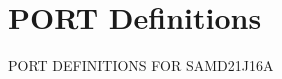 \hypertarget{group___s_a_m_d21_j16_a__port}{}\section{P\+O\+RT Definitions}
\label{group___s_a_m_d21_j16_a__port}
P\+O\+RT D\+E\+F\+I\+N\+I\+T\+I\+O\+NS F\+OR S\+A\+M\+D21\+J16A 
